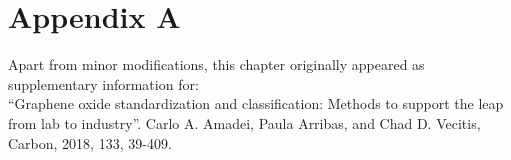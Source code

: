 \chapter{Appendix A}
\thispagestyle{plain}
\vspace{-.5cm}

\noindent Apart from minor modifications, this chapter originally appeared as supplementary information for:\newline\\
\ssp ``Graphene oxide standardization and classification: Methods to support the leap from lab to industry''. 
Carlo A. Amadei, Paula Arribas, and Chad D. Vecitis, Carbon, 2018, 133, 39-409.


    \dsp


